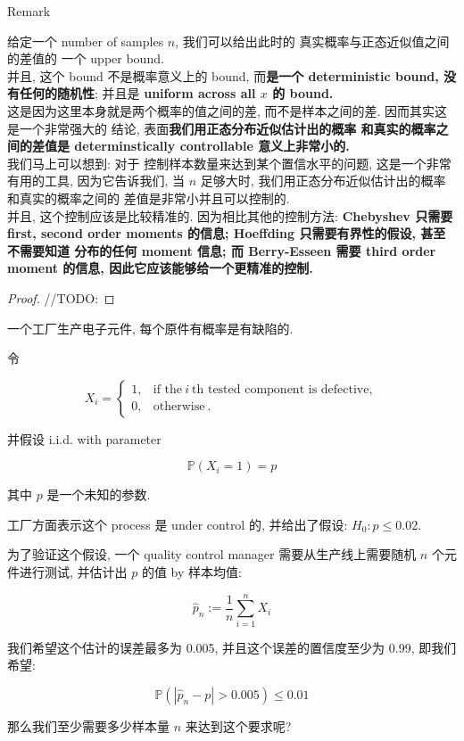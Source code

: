\begin{qlremark}{Remark}

给定一个 number of samples \(\mathit{n}\), 我们可以给出此时的 真实概率与正态近似值之间的差值的 一个 upper bound.\\
并且, 这个 bound 不是概率意义上的 bound, 而\textbf{是一个 deterministic bound, 没有任何的随机性}; 并且是 \textbf{uniform across all \(\mathit{x}\) 的 bound.}\\
这是因为这里本身就是两个概率的值之间的差, 而不是样本之间的差. 因而其实这是一个非常强大的 结论, 表面\textbf{我们用正态分布近似估计出的概率 和真实的概率之间的差值是 determinstically controllable 意义上非常小的.}\\
我们马上可以想到: 对于 控制样本数量来达到某个置信水平的问题, 这是一个非常有用的工具, 因为它告诉我们, 当 \(\mathit{n}\) 足够大时, 我们用正态分布近似估计出的概率和真实的概率之间的 差值是非常小并且可以控制的.\\
并且, 这个控制应该是比较精准的. 因为相比其他的控制方法: \textbf{Chebyshev 只需要 first, second order moments 的信息; Hoeffding 只需要有界性的假设, 甚至不需要知道 分布的任何 moment 信息; 而 Berry-Esseen 需要 third order moment 的信息, 因此它应该能够给一个更精准的控制.}

\end{qlremark}

\begin{proof}

//TODO:

\end{proof}

\begin{example}

一个工厂生产电子元件, 每个原件有概率是有缺陷的.

令

\[\mathit{X}_{\mathit{i}} = \left\{ \begin{matrix}
{1,} & {\text{if the}\ \mathit{i}\ \text{th tested component is defective},} \\
{0,} & {\text{otherwise}\ .}
\end{matrix} \right.\]

并假设 i.i.d. with parameter

\[\mathbb{P}(\mathit{X}_{\mathit{i}} = 1) = \mathit{p}\]

其中 \(\mathit{p}\) 是一个未知的参数.

工厂方面表示这个 process 是 under control 的, 并给出了假设: \(\mathit{H}_{0}:\mathit{p} \leq 0.02\).

为了验证这个假设, 一个 quality control manager 需要从生产线上需要随机 \(\mathit{n}\) 个元件进行测试, 并估计出 \(\mathit{p}\) 的值 by 样本均值:

\[{\widehat{\mathit{p}}}_{\mathit{n}} := \frac{1}{\mathit{n}}\sum\limits_{\mathit{i} = 1}^{\mathit{n}}\mathit{X}_{\mathit{i}}\]

我们希望这个估计的误差最多为 0.005, 并且这个误差的置信度至少为 0.99, 即我们希望:

\[\mathbb{P}\left( {\left| {{\widehat{\mathit{p}}}_{\mathit{n}} - \mathit{p}} \right| > 0.005} \right) \leq 0.01\]

那么我们至少需要多少样本量 \(\mathit{n}\) 来达到这个要求呢?

\end{example}

